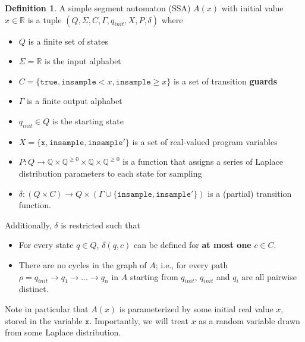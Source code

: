 \documentclass[12pt]{article}
\newcommand{\QQ}{\mathbb{Q}}
\newcommand{\RR}{\mathbb{R}}
\newcommand{\gguard}[1][x]{\texttt{insample}\geq #1}
\newcommand{\lguard}[1][x]{\texttt{insample} < #1}
\theoremstyle{definition}
\newtheorem{defn}[thm]{Definition}
\begin{document}
\begin{defn}\label{SSADefn}
    A simple segment automaton (SSA) $A(x)$ with initial value $x\in \RR$ is a tuple $(Q, \Sigma, C, \Gamma, q_{init}, X, P, \delta)$ where\begin{itemize}
        \item $Q$ is a finite set of states
        \item $\Sigma = \RR$ is the input alphabet
        \item $C = \{\texttt{true}, \lguard, \gguard\}$ is a set of transition \textbf{guards}
        \item $\Gamma$ is a finite output alphabet
        \item $q_{init}\in Q$ is the starting state
        \item $X = \{\texttt{x}, \texttt{insample}, \texttt{insample}'\}$ is a set of real-valued program variables
        \item $P: Q\to \QQ\times \QQ^{\geq 0}\times \QQ\times  \QQ^{\geq 0}$ is a function that assigns a series of Laplace distribution parameters to each state for sampling
        \item $\delta: (Q\times C)\to Q\times (\Gamma\cup\{\texttt{insample}, \texttt{insample}'\})$ is a (partial) transition function. 
    \end{itemize}
    Additionally, $\delta$ is restricted such that \begin{itemize}  
        \item For every state $q\in Q$,  $\delta(q, c)$ can be defined for \textbf{at most one} $c\in C$. 
        \item There are no cycles in the graph of $A$; i.e., for every path $\rho = q_{init} \to q_1\to\ldots\to q_n$ in $A$ starting from $q_{init}$, $q_{init}$ and $q_i$ are all pairwise distinct. 
    \end{itemize}

    Note in particular that $A(x)$ is parameterized by some initial real value $x$, stored in the variable $\texttt{x}$. Importantly, we will treat $x$ as a random variable drawn from some Laplace distribution.
\end{defn}
\end{document}
